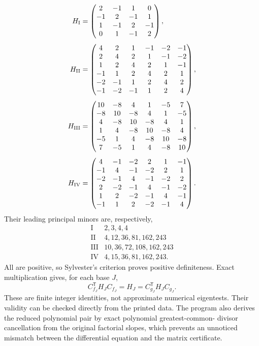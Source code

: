 \documentclass[11pt]{article}
\theoremstyle{definition}
\theoremstyle{remark}
\begin{document}
\begin{align}
 H_{\rm I}&=\begin{pmatrix}
2&-1&1&0\\-1&2&-1&1\\1&-1&2&-1\\0&1&-1&2
\end{pmatrix},\label{ffd:eq:HI}\\[4pt]
 H_{\rm II}&=\begin{pmatrix}
4&2&1&-1&-2&-1\\2&4&2&1&-1&-2\\1&2&4&2&1&-1\\
-1&1&2&4&2&1\\-2&-1&1&2&4&2\\-1&-2&-1&1&2&4
\end{pmatrix},\label{ffd:eq:HII}\\[4pt]
 H_{\rm III}&=\begin{pmatrix}
10&-8&4&1&-5&7\\-8&10&-8&4&1&-5\\4&-8&10&-8&4&1\\
1&4&-8&10&-8&4\\-5&1&4&-8&10&-8\\7&-5&1&4&-8&10
\end{pmatrix},\label{ffd:eq:HIII}\\[4pt]
 H_{\rm IV}&=\begin{pmatrix}
4&-1&-2&2&1&-1\\-1&4&-1&-2&2&1\\-2&-1&4&-1&-2&2\\
2&-2&-1&4&-1&-2\\1&2&-2&-1&4&-1\\-1&1&2&-2&-1&4
\end{pmatrix}.\label{ffd:eq:HIV}
\end{align}
Their leading principal minors are, respectively,
\begin{equation}
\begin{array}{c|l}
\mathrm I&2,3,4,4\\
\mathrm {II}&4,12,36,81,162,243\\
\mathrm {III}&10,36,72,108,162,243\\
\mathrm {IV}&4,15,36,81,162,243.
\end{array}
\label{ffd:eq:minors}
\end{equation}
All are positive, so Sylvester's criterion proves positive definiteness.
Exact multiplication gives, for each base $J$,
\begin{equation}
 C_{f_J}^{\mathsf T}H_JC_{f_J}=H_J
 =C_{g_J}^{\mathsf T}H_JC_{g_J}.
 \label{ffd:eq:gramidentity}
\end{equation}
These are finite integer identities, not approximate numerical eigentests.
Their validity can be checked directly from the printed data. The program
also derives the reduced polynomial pair by exact polynomial greatest-common-
divisor cancellation from the original factorial slopes, which prevents an
unnoticed mismatch between the differential equation and the matrix certificate.
\end{document}
